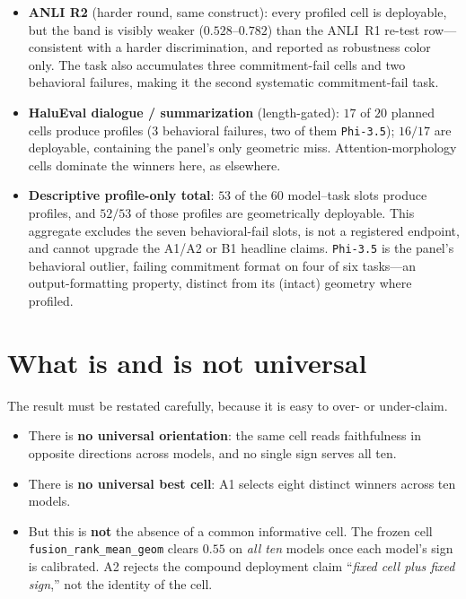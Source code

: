 \documentclass[11pt]{article}
\begin{document}
\begin{itemize}
\item \textbf{ANLI R2} (harder round, same construct): every profiled cell is deployable, but the
band is visibly weaker ($0.528$--$0.782$) than the ANLI~R1 re-test row---consistent with a
harder discrimination, and reported as robustness color only. The task also accumulates three
commitment-fail cells and two behavioral failures, making it the second systematic
commitment-fail task.
\item \textbf{HaluEval dialogue / summarization} (length-gated): $17$ of $20$ planned cells
produce profiles ($3$ behavioral failures, two of them \texttt{Phi-3.5}); $16/17$ are deployable,
containing the panel's only geometric miss. Attention-morphology cells dominate the winners here,
as elsewhere.
\item \textbf{Descriptive profile-only total}: $53$ of the $60$ model--task slots produce
profiles, and $52/53$ of those profiles are geometrically deployable. This aggregate excludes
the seven behavioral-fail slots, is not a registered endpoint, and cannot upgrade the A1/A2 or
B1 headline claims. \texttt{Phi-3.5} is the panel's behavioral outlier, failing commitment
format on four of six tasks---an output-formatting property, distinct from its (intact) geometry
where profiled.
\end{itemize}

\section{What is and is not universal}

The result must be restated carefully, because it is easy to over- or under-claim.

\begin{itemize}
\item There is \textbf{no universal orientation}: the same cell reads faithfulness in opposite
directions across models, and no single sign serves all ten.
\item There is \textbf{no universal best cell}: A1 selects eight distinct winners across ten models.
\item But this is \textbf{not} the absence of a common informative cell. The frozen cell
\texttt{fusion\_rank\_mean\_geom} clears $0.55$ on \emph{all ten} models once each model's sign is
calibrated. A2 rejects the compound deployment claim ``\emph{fixed cell plus fixed sign},'' not the
identity of the cell.
\end{itemize}
\end{document}
